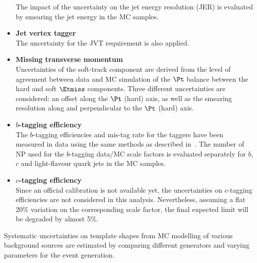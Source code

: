 \begin{itemize}
	The impact of the uncertainty on the jet energy resolution (JER) is
	evaluated by smearing the jet energy in the MC samples. 
	\item \textbf{Jet vertex tagger} \\ 
	The uncertainty for the JVT requirement is also applied. 	
	\item \textbf{Missing transverse momentum} \\ 
	Uncertainties of the soft-track component are derived from the level
	of agreement between data and MC simulation of the $\Pt$ balance
	between the hard and soft $\Etmiss$ components. Three different
	uncertainties are considered: an offset along the $\Pt$ (hard) axis,
	as well as the smearing resolution along and perpendicular to the
	$\Pt$ (hard) axis.
	\item \textbf{$b$-tagging efficiency} \\ 
	The $b$-tagging efficiencies and mis-tag rate for the taggers have
	been measured in data using the same methods as described
	in~\cite{ATLAS-CONF-2014-046,ATLAS-CONF-2014-004}. The number of NP
	used for the $b$-tagging data/MC scale factors is evaluated
	separately for $b$, $c$ and light-flavour quark jets in the MC
	samples.
	\item \textbf{$c$-tagging efficiency} \\
	Since an official calibration is not available yet, the uncertainties on $c$-tagging
	efficiencies are not considered in this analysis. Nevertheless,
	assuming a flat 20\% variation on the corresponding scale factor, 
	the final expected limit will be degraded by almost 5\%.	
\end{itemize}

\newpage
\noindent Systematic uncertainties on template shapes from MC modelling of various background sources are 
estimated by comparing different generators and varying parameters for the event generation.

